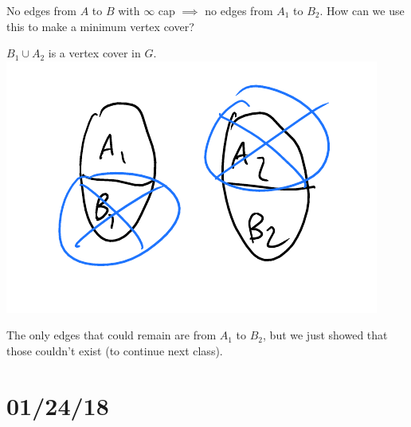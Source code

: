 \documentclass[12 pt]{article}
\begin{document}
        No edges from $A$ to $B$ with $\infty$ cap $\implies$ no edges
        from $A_1$ to $B_2$. How can we use this to make a minimum
        vertex cover?

        $B_1 \cup A_2$ is a vertex cover in $G$.
        \\ \includegraphics[width=.9\textwidth]{i60.pdf}

        The only edges that could remain are from $A_1$ to $B_2$, but
        we just showed that those couldn't exist (to continue next class).
        \section{01/24/18}
\end{document}
